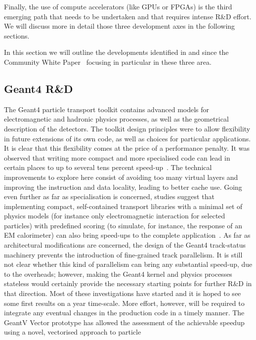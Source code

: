 \documentclass[11pt,a4paper]{article}
\begin{document}
Finally, the use of compute
accelerators (like GPUs or FPGAs) is the third emerging path that needs
to be undertaken and that requires intense R\&D effort. We will discuss
more in detail those three development axes in the following sections.

In this section we will outline the developments identified in and since the
Community White Paper~\cite{Albrecht2019, SimFoundation2018hep} focusing
in particular in these three area. 

\hypertarget{geant4-rd}{%
\subsection{Geant4 R\&D}\label{geant4-rd}}

The Geant4 particle transport toolkit contains advanced models for
electromagnetic and hadronic physics processes, as well as the
geometrical description of the detectors. The toolkit design principles
were to allow flexibility in future extensions of its own code, as well
as choices for particular applications. It is clear that this
flexibility comes at the price of a performance penalty. It was observed that
writing more compact and more specialised code can lead in certain
places to up to several tens percent speed-up~\cite{GeantV}. The
technical improvements to explore here consist of avoiding too many
virtual layers and improving the instruction and data locality, leading
to better cache use. Going even further as far as specialisation is
concerned, studies suggest that implementing compact, self-contained
transport libraries with a minimal set of physics models (for instance
only electromagnetic interaction for selected particles) with predefined
scoring (to simulate, for instance, the response of an EM calorimeter)
can also bring speed-ups to the complete application~\cite{GeantV}. As
far as architectural modifications are concerned, the design of the
Geant4 track-status machinery prevents the introduction of fine-grained
track parallelism. It is still not clear whether this kind of
parallelism can bring any substantial speed-up, due to the overheads;
however, making the Geant4 kernel and physics processes stateless would
certainly provide the necessary starting points for further R\&D in that
direction. Most of these investigations have started and it is hoped to
see some first results on a year time-scale. More effort, however, will
be required to integrate any eventual changes in the production code in
a timely manner. The GeantV Vector prototype has allowed the assessment
of the achievable speedup using a novel, vectorised approach to particle
\end{document}
